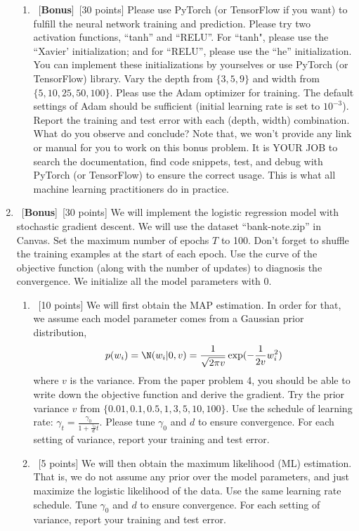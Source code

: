 \documentclass[12pt, fullpage,letterpaper]{article}
\begin{document}
\begin{enumerate}
\begin{enumerate}
	\item~[\textbf{Bonus}]~[30 points] Please use PyTorch (or TensorFlow if you want) to fulfill the neural network training and prediction. Please try two activation functions, ``tanh'' and ``RELU''.  For ``tanh", please use the ``Xavier' initialization; and for ``RELU'', please use the ``he'' initialization. You can implement these initializations by yourselves or use PyTorch (or TensorFlow) library. 
	Vary the depth from $\{3, 5, 9\} $ and width from $\{5, 10, 25, 50, 100\}$. Pleas use the Adam optimizer for training. The default settings of Adam should be sufficient (\eg initial learning rate is set to $10^{-3}$). 
	 Report the training and test error with each (depth, width) combination. What do you observe and conclude? Note that, we won't provide any link or manual for you to work on this bonus problem. It is YOUR JOB to search the documentation, find  code snippets, test, and debug with PyTorch (or TensorFlow) to ensure the correct usage. This is what all machine learning practitioners do in practice. 
	
\end{enumerate} 

\item~[\textbf{Bonus}]~[30 points] We will implement the logistic regression model with stochastic gradient descent. We will use the  dataset ``bank-note.zip'' in Canvas.  Set the maximum number of epochs $T$ to 100. Don't forget to shuffle the training examples at the start of each epoch. Use the curve of the objective function (along with the number of updates) to diagnosis the convergence. We initialize all the model parameters with $0$.

\begin{enumerate}
	\item~[10 points] We will first obtain the MAP estimation. In order for that, we assume each model parameter comes from a Gaussian prior distribution, 
	\[
	p(w_i ) = \N(w_i |0, v)=\frac{1}{\sqrt{2\pi v}} \exp(-\frac{1}{2v}w_i^2)
	\]
	where $v$ is the variance.  From the paper problem 4, you should be able to write down  the objective function and derive the gradient. Try the prior variance $v$ from $\{0.01, 0.1, 0.5, 1, 3, 5, 10, 100\}$. 
	Use the schedule of learning rate: $\gamma_t = \frac{\gamma_0}{1+\frac{\gamma_0}{d}t}	$. Please tune $\gamma_0$ and $d$ to ensure convergence. For each setting of variance, report your training and test error. 
	\item~[5 points] We will then obtain the maximum likelihood (ML) estimation. That is, we do not assume any prior over the model parameters, and just maximize the logistic likelihood of the data. Use the same learning rate schedule. Tune $\gamma_0$ and $d$ to ensure convergence. For each setting of variance, report your training and test error. 
	

\end{enumerate}
\end{enumerate}
\end{document}
